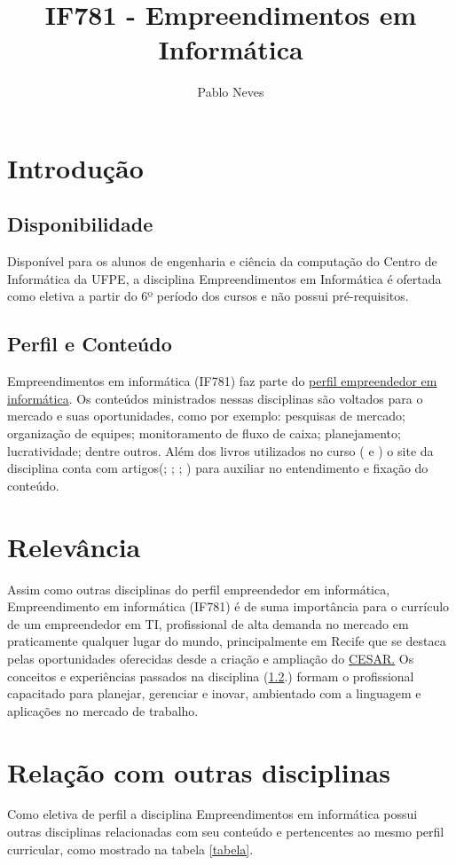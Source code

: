 \documentclass[a4paper]{article}
\title{IF781 - Empreendimentos em Informática}
\author{Pablo Neves}
\begin{document}
\maketitle
\section{Introdução}
\subsection{Disponibilidade}
Disponível para os alunos de engenharia e ciência da computação
do Centro de Informática da UFPE, a disciplina Empreendimentos
em Informática é ofertada como eletiva a partir do 6º período 
dos cursos e não possui pré-requisitos.
\subsection{Perfil e Conteúdo}
\label{conteudo}
Empreendimentos em informática (IF781) faz parte do \href{http://www.cin.ufpe.br/~graduacao/reforma/a_perfil_empreendedor_informatica.htm}{perfil empreendedor em informática}. Os conteúdos ministrados nessas disciplinas são voltados para o mercado e suas oportunidades, como por exemplo: pesquisas de mercado; organização de equipes; monitoramento de fluxo de caixa; planejamento; lucratividade; dentre outros. Além dos livros utilizados no curso (\cite{manualempreendedorismo2003} e \cite{planejamentosestrategico}) o site da disciplina conta com artigos(\cite{culturainovacao}; \cite{ideacao}; \cite{processoscriativos}; \cite{7answers}) para auxiliar no entendimento e fixação do conteúdo.
\section{Relevância}
Assim como outras disciplinas do perfil empreendedor em informática, Empreendimento em informática (IF781) é de suma importância para o currículo de um empreendedor em TI, profissional de alta demanda no mercado em praticamente qualquer lugar do mundo, principalmente em Recife que se destaca pelas oportunidades oferecidas desde a criação e ampliação do \href{https://www.cesar.org.br/}{CESAR.} Os conceitos e experiências passados na disciplina (\ref{conteudo}.) formam o profissional capacitado para planejar, gerenciar e inovar, ambientado com a linguagem e aplicações no mercado de trabalho.
\section{Relação com outras disciplinas}
Como eletiva de perfil a disciplina Empreendimentos em informática possui outras disciplinas relacionadas com seu conteúdo e pertencentes ao mesmo perfil curricular, como mostrado na tabela \ref{tabela}. \pagebreak
\end{document}
